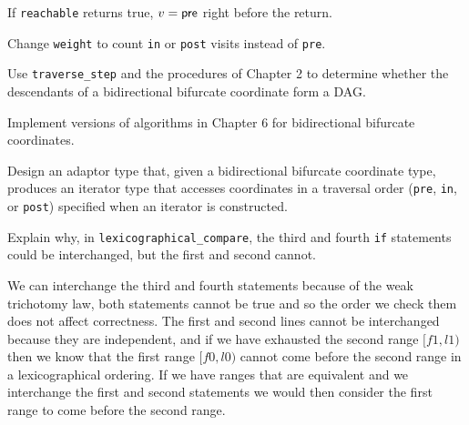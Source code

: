 \begin{lemma}
	If \verb|reachable| returns true, $v = \mathsf{pre}$ right before the return.
\end{lemma}

\begin{exercise}
	Change \verb|weight| to count \verb|in| or \verb|post| visits instead of \verb|pre|.
\end{exercise}



\begin{exercise}
	Use \verb|traverse_step| and the procedures of Chapter 2 to determine whether the
	descendants of a bidirectional bifurcate coordinate form a DAG.
\end{exercise}



\begin{project}
	Implement versions of algorithms in Chapter 6 for bidirectional bifurcate coordinates.
\end{project}

\begin{project}
	Design an adaptor type that, given a bidirectional bifurcate coordinate type, produces an iterator type
	that accesses coordinates in a traversal order (\verb|pre|, \verb|in|, or \verb|post|) specified when an
	iterator is constructed.
\end{project}

\begin{exercise}
	Explain why, in \verb|lexicographical_compare|, the third and fourth \verb|if| statements could be
	interchanged, but the first and second cannot.
\end{exercise}

\begin{solution}
	We can interchange the third and fourth statements because of the weak trichotomy law, both statements
	cannot be true and so the order we check them does not affect correctness. The first and second lines
	cannot be interchanged because they are independent, and if we have exhausted the second range $[f1, l1)$
	then we know that the first range $[f0, l0)$ cannot come before the second range in a lexicographical
	ordering. If we have ranges that are equivalent and we interchange the first and second statements we would
	then consider the first range to come before the second range.
\end{solution}
